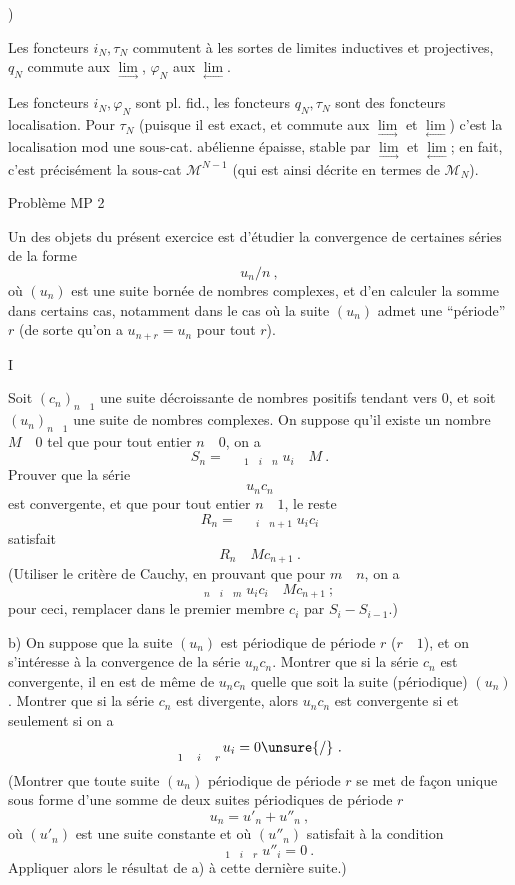 
\uline{})

Les foncteurs $i_N,\tau_N$ commutent à  les sortes de limites inductives et projectives, $q_N$ commute aux $\underset{\longrightarrow}{\lim}$, $\varphi_N$ aux $\underset{\longleftarrow}{\lim}$.

Les foncteurs $i_N,\varphi_N$ sont pl. fid., les foncteurs $q_N,\tau_N$ sont des foncteurs localisation.  Pour $\tau_N$ (puisque il est exact, et commute aux $\underset{\longrightarrow}{\lim}$ et $\underset{\longleftarrow}{\lim}$) c'est la localisation mod une sous-cat. abélienne épaisse, stable par $\underset{\longrightarrow}{\lim}$ et $\underset{\longleftarrow}{\lim}$; en fait, c'est précisément la sous-cat $\mathcal M^{N-1}$ (qui est ainsi décrite  en termes de $\mathcal M_N$).


\begin{center}Problème MP 2\end{center}

Un des objets du présent exercice est d'étudier la convergence de certaines séries de la forme
\[ u_n/n\ , \]
où $(u_n)$ est une suite bornée de nombres complexes, et d'en calculer la somme dans certains cas, notamment dans le cas où la suite $(u_n)$ admet une ``période'' $r$ (de sorte qu'on a $u_{n+r}=u_n$ pour tout $r$).

I

Soit $(c_n)_{n\quad1}$ une suite décroissante de nombres positifs tendant vers
$0$, et soit $(u_n)_{n\quad1}$ une suite de nombres complexes.  On suppose qu'il existe un nombre $M\quad0$ tel que pour tout entier $n\quad0$, on a
\[ S_n=\mathop{\quad}_{1\quad i\quad n}u_i\quad M\ . \]
 Prouver que la série
\[ u_nc_n \]
est convergente, et que pour tout entier $n\quad1$, le reste
\[ R_n=\mathop{\quad}_{i\quad n+1}u_ic_i \]
satisfait
\[ R_n\quad Mc_{n+1}\ . \]
(Utiliser le critère de Cauchy, en prouvant que pour $m\quad n$, on a
\[ \mathop{\quad}_{n\quad i\quad m}u_ic_i\quad Mc_{n+1}\ ; \]
pour ceci, remplacer dans le premier membre $c_i$ par $S_i-S_{i-1}$.)

b) On suppose que la suite $(u_n)$ est périodique de période $r$ ($r\quad1$), et on s'intéresse à la convergence de la série $u_nc_n$. Montrer que si la série $c_n$ est convergente, il en est de même de $u_nc_n$ quelle que soit la suite (périodique) $(u_n)$. Montrer que si la série $c_n$ est divergente, alors $u_nc_n$ est convergente si et seulement si on a
\[ \mathop{\quad}_{1\quad i\quad r}u_i=0\unsure{/}\ . \]
(Montrer que toute suite $(u_n)$ périodique de période $r$ se met de façon unique sous forme d'une somme de deux suites périodiques de période $r$
\[ u_n=u'_n+u''_n\ , \]
où $(u'_n)$ est une suite constante et où $(u''_n)$ satisfait à la condition
\[ \mathop{\quad}_{1\quad i\quad r}u''_i=0\ . \]
Appliquer alors le résultat de a) à cette dernière suite.)

